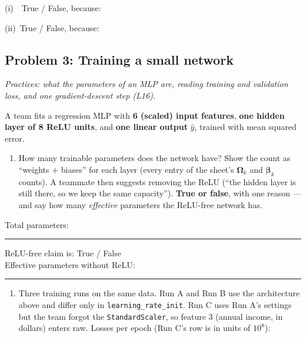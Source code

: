 \documentclass[
  11pt,
]{article}
\providecommand{\tightlist}{%
  \setlength{\itemsep}{0pt}\setlength{\parskip}{0pt}}
\newcommand{\answerspace}[1]{\par\vspace*{#1}}  %
\newcommand{\blank}[1][1.2in]{\rule{#1}{0.4pt}}
\newcommand{\answerpage}{\clearpage}
\begin{document}
\noindent (i)\ \ True / False, because: \answerspace{0.65in}
\noindent (ii)\ True / False, because: \answerspace{0.65in}

\answerpage

\subsection{Problem 3: Training a small
network}\label{problem-3-training-a-small-network}

\emph{Practices: what the parameters of an MLP are, reading training and
validation loss, and one gradient-descent step (L16).}

A team fits a regression MLP with \textbf{6 (scaled) input features},
\textbf{one hidden layer of 8 ReLU units}, and \textbf{one linear
output} \(\hat y\), trained with mean squared error.

\begin{enumerate}
\def\labelenumi{(\alph{enumi})}
\tightlist
\item
  How many trainable parameters does the network have? Show the count as
  ``weights \(+\) biases'' for each layer (every entry of the sheet's
  \(\boldsymbol\Omega_k\) and \(\boldsymbol\beta_k\) counts). A teammate
  then suggests removing the ReLU (``the hidden layer is still there, so
  we keep the same capacity''). \textbf{True or false}, with one reason
  --- and say how many \emph{effective} parameters the ReLU-free network
  has.
\end{enumerate}

Total parameters: \blank[0.7in]\qquad ReLU-free claim is: True / False\\
Effective parameters without ReLU: \blank[0.7in]

\mbox{}

\par\nobreak\answerspace{1.1in}

\begin{enumerate}
\def\labelenumi{(\alph{enumi})}
\setcounter{enumi}{1}
\tightlist
\item
  Three training runs on the same data. Run A and Run B use the
  architecture above and differ only in \texttt{learning\_rate\_init}.
  Run C uses Run A's settings but the team forgot the
  \texttt{StandardScaler}, so feature 3 (annual income, in dollars)
  enters raw. Losses per epoch (Run C's row is in units of \(10^8\)):
\end{enumerate}
\end{document}
